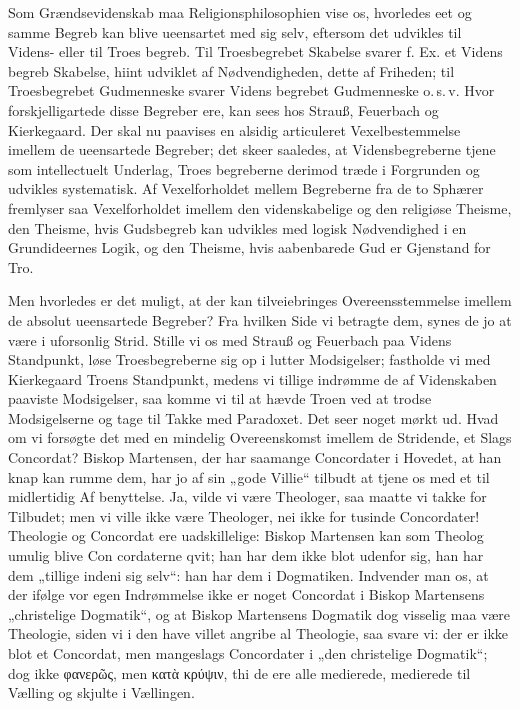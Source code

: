 \documentclass[12pt]{book}
\newcommand{\opage}[1]{\marginnote{\footnotesize\textit{[#1]}}}
\begin{document}
Som Grændsevidenskab maa Religionsphilosophien vise
os, hvorledes eet og samme Begreb kan blive ueensartet med
sig selv, eftersom det udvikles til Videns- eller til Troes\-%
begreb. Til Troesbegrebet Skabelse svarer f. Ex. et Videns\-%
begreb Skabelse, hiint udviklet af Nødvendigheden, dette
af Friheden; til Troesbegrebet Gudmenneske svarer Videns\-%
begrebet Gudmenneske o.\,s.\,v. Hvor forskjelligartede disse
\opage{138}\setcounter{footnote}{0}%
Begreber ere, kan sees hos Strauß, Feuerbach og Kierkegaard.
Der skal nu paavises en alsidig articuleret Vexelbestemmelse
imellem de ueensartede Begreber; det skeer saaledes, at
Vidensbegreberne tjene som intellectuelt Underlag, Troes\-%
begreberne derimod træde i Forgrunden og udvikles systematisk.
Af Vexelforholdet mellem Begreberne fra de to Sphærer
fremlyser saa Vexelforholdet imellem den videnskabelige og
den religiøse Theisme, den Theisme, hvis Gudsbegreb kan
udvikles med logisk Nødvendighed i en Grundideernes Logik,
og den Theisme, hvis aabenbarede Gud er Gjenstand for Tro.

Men hvorledes er det muligt, at der kan tilveiebringes
Overeensstemmelse imellem de absolut ueensartede Begreber?
Fra hvilken Side vi betragte dem, synes de jo at være i
uforsonlig Strid. Stille vi os med Strauß og Feuerbach
paa Videns Standpunkt, løse Troesbegreberne sig op i
lutter Modsigelser; fastholde vi med Kierkegaard Troens
Standpunkt, medens vi tillige indrømme de af Videnskaben
paaviste Modsigelser, saa komme vi til at hævde Troen ved at
trodse Modsigelserne og tage til Takke med Paradoxet. Det
seer noget mørkt ud. Hvad om vi forsøgte det med en
mindelig Overeenskomst imellem de Stridende, et Slags
Concordat? Biskop Martensen, der har saamange Concordater
i Hovedet, at han knap kan rumme dem, har jo af sin
„gode Villie“ tilbudt at tjene os med et til midlertidig Af\-%
benyttelse. Ja, vilde vi være Theologer, saa maatte vi takke
for Tilbudet; men vi ville ikke være Theologer, nei ikke for
tusinde Concordater! Theologie og Concordat ere uadskillelige:
Biskop Martensen kan som Theolog umulig blive Con\-%
cordaterne qvit; han har dem ikke blot udenfor sig, han har
dem „tillige indeni sig selv“: han har dem i Dogmatiken.
Indvender man os, at der ifølge vor egen Indrømmelse ikke er
noget Concordat i Biskop Martensens „christelige Dogmatik“,
og at Biskop Martensens Dogmatik dog visselig maa være
Theologie, siden vi i den have villet angribe al Theologie,
\opage{139}\setcounter{footnote}{0}%
saa svare vi: der er ikke blot et Concordat, men mangeslags
Concordater i „den christelige Dogmatik“; dog ikke φανερῶς,
men κατὰ κρύψιν, thi de ere alle medierede, medierede til
Vælling og skjulte i Vællingen.
\end{document}
